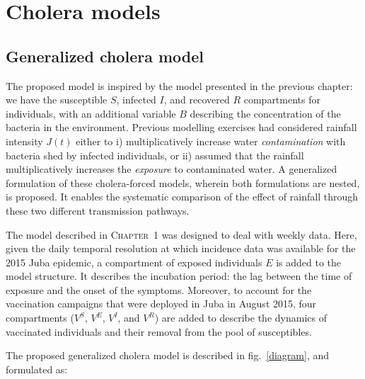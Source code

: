 \section{Cholera models}
\label{sec:meth}
\subsection{Generalized cholera model}
The proposed model is inspired by the model presented in the previous chapter: we have the susceptible $S$, infected $I$, and recovered $R$ compartments for individuals, with an additional variable $B$ describing the concentration of the bacteria in the environment. Previous modelling exercises had considered rainfall intensity $J(t)$ either to i) multiplicatively increase water \textit{contamination} with bacteria shed by infected  individuals\cite{Bertuzzo:ProbabilityExtinctionHaiti:2016,Pasetto:RealtimeProjectionsCholera:2017}, or ii) assumed that the rainfall multiplicatively increases the \textit{exposure} to contaminated water\cite{Eisenberg:ExaminingRainfallCholera:2013}. A generalized formulation of these cholera-forced models, wherein both formulations are nested, is proposed. It enables the systematic comparison of the effect of rainfall through these two different transmission pathways.

The model described in \textsc{Chapter~1} was designed to deal with weekly data. Here, given the daily temporal resolution at which incidence data was available for the 2015 Juba epidemic, a compartment of exposed individuals $E$ is added to the model structure. It describes the incubation period: the lag between the time of exposure and the onset of the symptoms. Moreover, to account for the vaccination campaigns that were deployed in Juba in August 2015, four compartments ($V^S$, $V^E$, $V^I$, and $V^R$) are added to describe the dynamics of vaccinated individuals and their removal from the pool of susceptibles.

The proposed generalized cholera model is described in fig.~\ref{diagram}, and formulated as:

